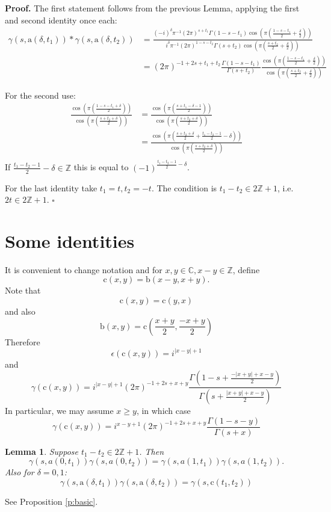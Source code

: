 \documentclass[10pt,leqno]{article}
\newtheorem{lemma}[equation]{Lemma}
\renewcommand{\sec}[1]{\section{#1}
\renewcommand{\theequation}{\thesection.\arabic{equation}}
  \setcounter{equation}{0}}
\newcommand{\qed}{\hfill $\square$ \medskip}
\newenvironment{proof}[1][Proof]{\noindent\textbf{#1.} }{\qed}
\newcommand{\C}{\mathbb C}
\newcommand{\Z}{\mathbb Z}
\renewcommand{\b}{\mathfrak b}
\renewcommand{\a}{\mathfrak a}
\newcommand\inv{^{-1}}
\renewcommand{\a}{\mathrm a}
\renewcommand{\b}{\mathrm b}
\renewcommand{\c}{\mathrm c}
\begin{document}
\begin{proof}
The first statement follows from the previous Lemma, applying the first and second identity once each:
$$
\begin{aligned}
  \gamma(s,\a(\delta,t_1))*\gamma(s,\a(\delta,t_2))&=
\frac{(-i)^\delta\pi\inv (2\pi)^{s+t_1}\Gamma(1-s-t_1)\cos(\pi(\frac{1-s-t_1}2+\frac\delta 2))}
{i^\delta\pi\inv(2\pi)^{1-s-t_2}\Gamma(s+t_2)\cos(\pi(\frac{s+t_2}2+\frac\delta 2))}\\
&=(2\pi)^{-1+2s+t_1+t_2}\frac{\Gamma(1-s-t_1)}{\Gamma(s+t_2)}\frac{\cos(\pi(\frac{1-s-t_1}2+\frac\delta 2))}{\cos(\pi(\frac{s+t_2}2+\frac\delta 2))}
\end{aligned}
$$

For the second use:
$$
\begin{aligned}
\frac{\cos(\pi(\frac{1-s-t_1+\delta}2))}
     {\cos(\pi(\frac{s+t_2+\delta}2))}&=
     \frac{\cos(\pi(\frac{s+t_1-\delta-1}2))}
          {\cos(\pi(\frac{s+t_2+\delta}2))}\\
          &=
    \frac{\cos(\pi(\frac{s+t_2+\delta}2+\frac{t_1-t_2-1}2-\delta))}
       {\cos(\pi(\frac{s+t_2+\delta}2))}\\
\end{aligned}
$$
If $\frac{t_1-t_2-1}2-\delta\in\Z$ this is equal to
$(-1)^{\frac{t_1-t_2-1}2-\delta}$.

For the last identity take $t_1=t,t_2=-t$. The condition is $t_1-t_2\in 2\Z+1$, i.e.
$2t\in 2\Z+1$.
\end{proof}

\sec{Some identities}

It is convenient to change notation and for $x,y\in \C, x-y\in\Z$, define
$$
\c(x,y)=\b(x-y,x+y).
$$
Note that
$$
\c(x,y)=\c(y,x)
$$
and also
$$
\b(x,y)=\c(\frac{x+y}2,\frac{-x+y}2)
$$
Therefore
$$
\epsilon(\c(x,y))=i^{|x-y|+1}
$$
and
$$
\gamma(\c(x,y))=i^{|x-y|+1}(2\pi)^{-1+2s+x+y}\frac{\Gamma(1-s+\frac{-|x+y|+x-y}2)}{\Gamma(s+\frac{|x+y|+x-y}2)}
$$
In particular, we may assume $x\ge y$, in which case
$$
\gamma(\c(x,y))=i^{x-y+1}(2\pi)^{-1+2s+x+y}\frac{\Gamma(1-s-y)}{\Gamma(s+x)}
$$



\begin{lemma}
Suppose $t_1-t_2\in2\Z+1$. Then
$$
\gamma(s,a(0,t_1))\gamma(s,a(0,t_2))=
\gamma(s,a(1,t_1))\gamma(s,a(1,t_2)).
$$
Also for $\delta=0,1$:
$$
\gamma(s,\a(\delta,t_1))\gamma(s,\a(\delta,t_2))=\gamma(s,\c(t_1,t_2))
$$
\end{lemma}


See Proposition \ref{p:basic}.
\end{document}
